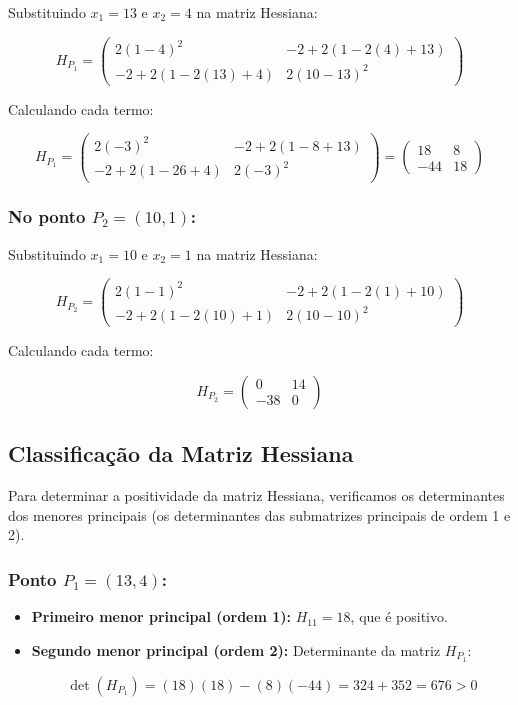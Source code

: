 \documentclass[a4paper, 12pt]{article}
\begin{document}
Substituindo \( x_1 = 13 \) e \( x_2 = 4 \) na matriz Hessiana:

\[
H_{P_1} = \begin{pmatrix}
2(1 - 4)^2 & -2 + 2(1 - 2(4) + 13) \\
-2 + 2(1 - 2(13) + 4) & 2(10 - 13)^2
\end{pmatrix}
\]

Calculando cada termo:

\[
H_{P_1} = \begin{pmatrix}
2(-3)^2 & -2 + 2(1 - 8 + 13) \\
-2 + 2(1 - 26 + 4) & 2(-3)^2
\end{pmatrix}
= \begin{pmatrix}
18 & 8 \\
-44 & 18
\end{pmatrix}
\]

\subsubsection{No ponto \( P_2 = (10, 1) \):}

Substituindo \( x_1 = 10 \) e \( x_2 = 1 \) na matriz Hessiana:

\[
H_{P_2} = \begin{pmatrix}
2(1 - 1)^2 & -2 + 2(1 - 2(1) + 10) \\
-2 + 2(1 - 2(10) + 1) & 2(10 - 10)^2
\end{pmatrix}
\]

Calculando cada termo:

\[
H_{P_2} = \begin{pmatrix}
0 & 14 \\
-38 & 0
\end{pmatrix}
\]

\subsection{Classificação da Matriz Hessiana}

Para determinar a positividade da matriz Hessiana, verificamos os determinantes dos menores principais (os determinantes das submatrizes principais de ordem 1 e 2).

\subsubsection{Ponto \( P_1 = (13, 4) \):}

\begin{itemize}
    \item \textbf{Primeiro menor principal (ordem 1):} \( H_{11} = 18 \), que é positivo.
    \item \textbf{Segundo menor principal (ordem 2):} Determinante da matriz \( H_{P_1} \):

    \[
    \det(H_{P_1}) = (18)(18) - (8)(-44) = 324 + 352 = 676 > 0
    \]

\end{itemize}
\end{document}
